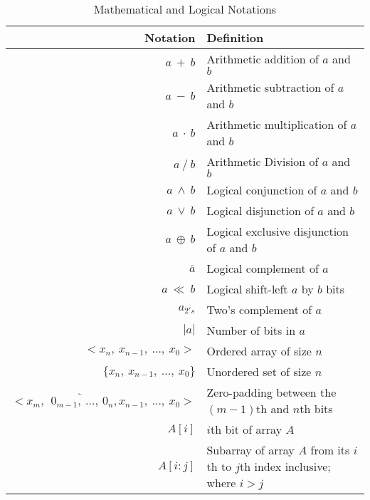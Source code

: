         \begin{table}[h]
            \def\arraystretch{2}
            \caption{Mathematical and Logical Notations}

            \centering
            \begin{tabular*}{470pt}{@{\extracolsep{\fill}} r p{9cm}}

            \textbf{Notation} & \textbf{Definition} \\
            \hline
            $a \ + \ b$ & Arithmetic addition of $a$ and $b$\\
            $a \ - \ b$ & Arithmetic subtraction of $a$ and $b$\\
            $a \ \cdot \ b$ & Arithmetic multiplication of $a$ and $b$\\
            $a \ / \ b$ & Arithmetic Division of $a$ and $b$\\
            $a \ \wedge \ b$ & Logical conjunction of $a$ and $b$\\
            $a \ \vee \ b$ & Logical disjunction of $a$ and $b$\\
            $a \ \oplus \ b$ & Logical exclusive disjunction of $a$ and $b$\\
            $\overline{a}$ & Logical complement of $a$\\
            $a \ \ll \ b$ & Logical shift-left $a$ by $b$ bits\\
            $a_{2's}$ & Two's complement of $a$\\
            $|a|$ & Number of bits in $a$\\
            $<x_{n}, \ x_{n-1}, \ \ldots, \ x_{0}>$ & Ordered array of size $n$
            \\
            $\{x_{n}, \ x_{n-1}, \ \ldots, \ x_{0}\}$ & Unordered set of size
            $n$ \\
            $< x_{m}, \ \ \overleftarrow{0_{m-1}, \ \ldots, \ 0_{n}}, x_{n-1}, \
            \ldots, \ x_{0} >$ & Zero-padding between the $(m-1)$th and $n$th
            bits \\
            $A[i]$ & $i$th bit of array $A$ \\
            $A[i:j]$ & Subarray of array $A$ from its $i$th to $j$th index
            inclusive; where $i > j$ \\

            \end{tabular*}
        \end{table}


    \newpage
